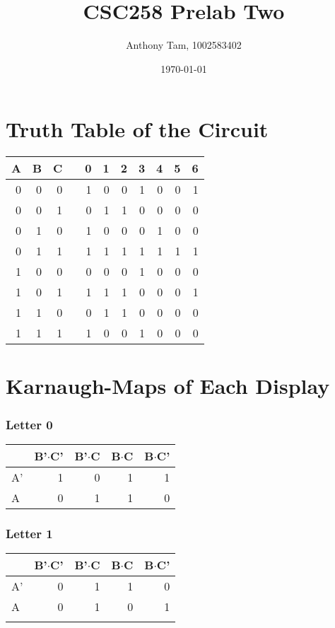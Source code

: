 \documentclass[11pt]{article}
\author{Anthony Tam, 1002583402}
\date{\today}
\title{CSC258 Prelab Two}
\begin{document}
\maketitle

\section{Truth Table of the Circuit}
\label{sec-1}
\begin{center}
\begin{tabular}{rrrlrrrrrrr}
A & B & C &  & 0 & 1 & 2 & 3 & 4 & 5 & 6\\
\hline
0 & 0 & 0 &  & 1 & 0 & 0 & 1 & 0 & 0 & 1\\
0 & 0 & 1 &  & 0 & 1 & 1 & 0 & 0 & 0 & 0\\
0 & 1 & 0 &  & 1 & 0 & 0 & 0 & 1 & 0 & 0\\
0 & 1 & 1 &  & 1 & 1 & 1 & 1 & 1 & 1 & 1\\
1 & 0 & 0 &  & 0 & 0 & 0 & 1 & 0 & 0 & 0\\
1 & 0 & 1 &  & 1 & 1 & 1 & 0 & 0 & 0 & 1\\
1 & 1 & 0 &  & 0 & 1 & 1 & 0 & 0 & 0 & 0\\
1 & 1 & 1 &  & 1 & 0 & 0 & 1 & 0 & 0 & 0\\
\end{tabular}
\end{center}

\section{Karnaugh-Maps of Each Display}
\label{sec-2}
\subsubsection{Letter 0}
\label{sec-2-0-1}
\begin{center}
\begin{tabular}{lrrrr}
 & B'$\cdot$C' & B'$\cdot$C & B$\cdot$C & B$\cdot$C'\\
\hline
A' & 1 & 0 & 1 & 1\\
A & 0 & 1 & 1 & 0\\
\end{tabular}
\end{center}
\subsubsection{Letter 1}
\label{sec-2-0-2}
\begin{center}
\begin{tabular}{lrrrr}
 & B'$\cdot$C' & B'$\cdot$C & B$\cdot$C & B$\cdot$C'\\
\hline
A' & 0 & 1 & 1 & 0\\
A & 0 & 1 & 0 & 1\\
 &  &  &  & \\
\end{tabular}
\end{center}
\end{document}
